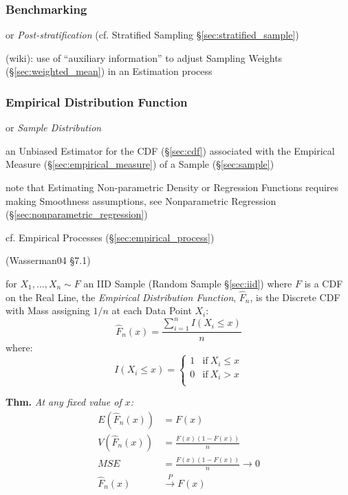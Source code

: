 \subsubsection{Benchmarking}\label{sec:benchmarking}

or \emph{Post-stratification} (cf. Stratified Sampling
\S\ref{sec:stratified_sample})

(wiki): use of ``auxiliary information'' to adjust Sampling Weights
(\S\ref{sec:weighted_mean}) in an Estimation process



\subsubsection{Empirical Distribution Function}
\label{sec:empirical_distribution}

or \emph{Sample Distribution}

an Unbiased Estimator for the CDF (\S\ref{sec:cdf}) associated with the
Empirical Measure (\S\ref{sec:empirical_measure}) of a Sample
(\S\ref{sec:sample})

note that Estimating Non-parametric Density or Regression Functions requires
making Smoothness assumptions, see Nonparametric Regression
(\S\ref{sec:nonparametric_regression})

\fist cf. Empirical Processes (\S\ref{sec:empirical_process})

(Wasserman04 \S7.1)

for $X_1, \ldots, X_n \sim F$ an IID Sample (Random Sample \S\ref{sec:iid})
where $F$ is a CDF on the Real Line, the \emph{Empirical Distribution Function},
$\hat{F}_n$, is the Discrete CDF with Mass assigning $1/n$ at each Data Point
$X_i$:
\[
  \hat{F}_n(x) = \frac{\sum_{i=1}^n I(X_i \leq x)}{n}
\]
where:
\[
  I(X_i \leq x) = \begin{cases}
    1 & \text{if}\ X_i \leq x \\
    0 & \text{if}\ X_i > x \\
  \end{cases}
\]

\textbf{Thm.} \emph{
  At any fixed value of $x$:
  \begin{align*}
    E(\hat{F}_n(x)) & = F(x)                     \\
    V(\hat{F}_n(x)) & = \frac{F(x)(1 - F(x))}{n} \\
    MSE & = \frac{F(x)(1-F(x))}{n} \to 0 \\
    \hat{F}_n(x) & \xrightarrow{P} F(x)          \\
  \end{align*}
}

